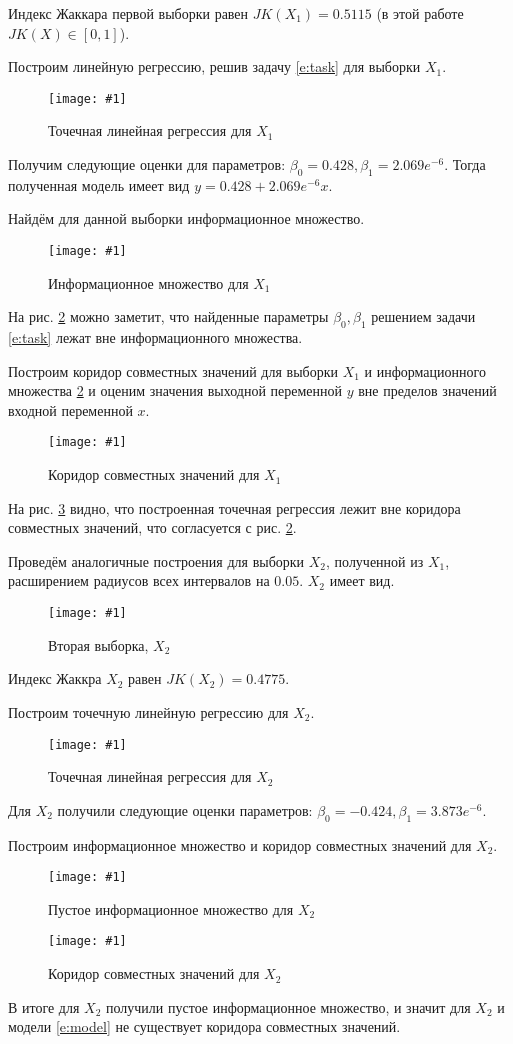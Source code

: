 \documentclass[a4paper,12pt]{article}
\newcommand{\plot}[3]{
    \begin{figure}[H]
        \begin{center}
            \texttt{[image: \#1]}
            \caption{#2}
            \label{#3}
        \end{center}
    \end{figure}
}
\begin{document}
    Индекс Жаккара первой выборки равен $ JK(X_1) = 0.5115 $ (в этой работе $ JK(X) \in [0, 1] $).

    Построим линейную регрессию, решив задачу \ref{e:task} для выборки $ X_1 $.
    \plot{PointRegressionX1}{Точечная линейная регрессия для $ X_1 $}{p:regressionX1}
    
    Получим следующие оценки для параметров: $ \beta_0 = 0.428, \beta_1 = 2.069e^{-6} $.
    Тогда полученная модель имеет вид $ y = 0.428 + 2.069e^{-6} x $.

    Найдём для данной выборки информационное множество.
    \plot{InformSetX1}{Информационное множество для $ X_1 $}{p:informSetX1}

    На рис. \ref{p:informSetX1} можно заметит, что найденные параметры
    $ \beta_0, \beta_1 $ решением задачи \ref{e:task} лежат вне информационного множества.

    Построим коридор совместных значений для выборки $ X_1 $ и информационного множества \ref{p:informSetX1}
    и оценим значения выходной переменной $ y $ вне пределов значений входной переменной $ x $.
    \plot{InformSetCorridorX1}{Коридор совместных значений для $ X_1 $}{p:informSetCorridorX1}

    На рис. \ref{p:informSetCorridorX1} видно, что построенная точечная регрессия лежит вне коридора совместных значений,
    что согласуется с рис. \ref{p:informSetX1}.

    Проведём аналогичные построения для выборки $ X_2 $, полученной из $ X_1 $, расширением радиусов
    всех интервалов на $ 0.05 $. $ X_2 $ имеет вид.
    \plot{X2}{Вторая выборка, $ X_2 $}{p:sampleX2}
    
    Индекс Жаккра $ X_2 $ равен $ JK(X_2) = 0.4775 $.

    Построим точечную линейную регрессию для $ X_2 $.
    \plot{PointRegressionX2}{Точечная линейная регрессия для $ X_2 $}{p:regressionX2}

    Для $ X_2 $ получили следующие оценки параметров: $ \beta_0 = -0.424, \beta_1 = 3.873e^{-6} $.

    Построим информационное множество и коридор совместных значений для $ X_2 $.

    \plot{InformSetX2}{Пустое информационное множество для $ X_2 $}{p:informSetX2}
    \plot{InformSetCorridorX2}{Коридор совместных значений для $ X_2 $}{p:informSetCorridorX2}

    В итоге для $ X_2 $ получили пустое информационное множество,
    и значит для $ X_2 $ и модели \ref{e:model} не существует коридора совместных значений.
\end{document}
